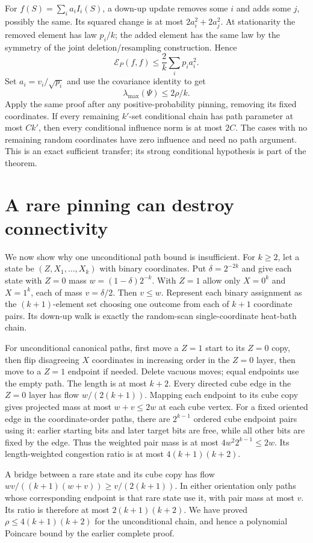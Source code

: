 \documentclass[11pt]{article}
\begin{document}
For $f(S)=\sum_i a_iI_i(S)$, a down-up update removes some
$i$ and adds some $j$, possibly the same. Its squared change
is at most $2a_i^2+2a_j^2$. At stationarity the removed element
has law $p_i/k$; the added element has the same law by the
symmetry of the joint deletion/resampling construction. Hence
\[
 \mathcal E_P(f,f)\le\frac2k\sum_i p_i a_i^2.
\]
Set $a_i=v_i/\sqrt{p_i}$ and use the covariance identity to get
\[
 \lambda_{\max}(\Psi)\le2\rho/k.
\]
Apply the same proof after any positive-probability pinning,
removing its fixed coordinates. If every remaining $k'$-set
conditional chain has path parameter at most $Ck'$, then every
conditional influence norm is at most $2C$. The cases with
no remaining random coordinates have zero influence and need
no path argument. This is an exact sufficient transfer; its
strong conditional hypothesis is part of the theorem.

\section{A rare pinning can destroy connectivity}
We now show why one unconditional path bound is insufficient.
For $k\ge2$, let a state be $(Z,X_1,\ldots,X_k)$ with binary
coordinates. Put $\delta=2^{-2k}$ and give each state with
$Z=0$ mass $w=(1-\delta)2^{-k}$. With $Z=1$ allow only
$X=0^k$ and $X=1^k$, each of mass $v=\delta/2$.
Then $v\le w$. Represent each binary assignment as the
$(k+1)$-element set choosing one outcome from each of $k+1$
coordinate pairs. Its down-up walk is exactly the random-scan
single-coordinate heat-bath chain.

For unconditional canonical paths, first move a $Z=1$ start
to its $Z=0$ copy, then flip disagreeing $X$ coordinates in
increasing order in the $Z=0$ layer, then move to a $Z=1$
endpoint if needed. Delete vacuous moves; equal endpoints use
the empty path. The length is at most $k+2$.
Every directed cube edge in the $Z=0$ layer has flow
$w/(2(k+1))$. Mapping each endpoint to its cube copy gives
projected mass at most $w+v\le2w$ at each cube vertex.
For a fixed oriented edge in the coordinate-order paths,
there are $2^{k-1}$ ordered cube endpoint pairs using it:
earlier starting bits and later target bits are free, while
all other bits are fixed by the edge. Thus the weighted pair
mass is at most
$4w^2 2^{k-1}\le2w$. Its length-weighted congestion ratio
is at most $4(k+1)(k+2)$.

A bridge between a rare state and its cube copy has flow
$wv/((k+1)(w+v))\ge v/(2(k+1))$. In either orientation
only paths whose corresponding endpoint is that rare state
use it, with pair mass at most $v$. Its ratio is therefore
at most $2(k+1)(k+2)$. We have proved
$\rho\le4(k+1)(k+2)$ for the unconditional chain, and hence
a polynomial Poincare bound by the earlier complete proof.
\end{document}
